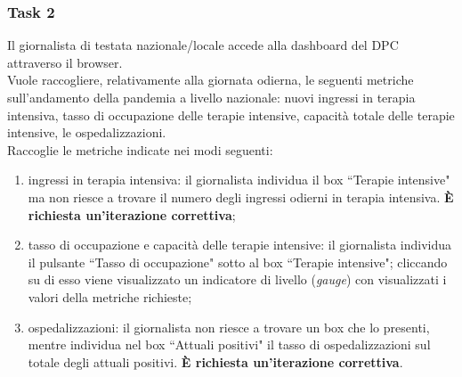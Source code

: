 \subsubsection{Task 2}
\label{sss:cw-task-2}

Il giornalista di testata nazionale/locale accede alla dashboard del DPC attraverso il browser.\\
Vuole raccogliere, relativamente alla giornata odierna, le seguenti metriche sull'andamento della pandemia a livello nazionale: nuovi ingressi in terapia intensiva, tasso di occupazione delle terapie intensive, capacità totale delle terapie intensive, le ospedalizzazioni.\\
Raccoglie le metriche indicate nei modi seguenti:
\begin{enumerate}
    \item ingressi in terapia intensiva: il giornalista individua il box ``Terapie intensive" ma non riesce a trovare il numero degli ingressi odierni in terapia intensiva. \textbf{È richiesta un'iterazione correttiva};\label{cw2:a}
    \item tasso di occupazione e capacità delle terapie intensive: il giornalista individua il pulsante ``Tasso di occupazione" sotto al box ``Terapie intensive"; cliccando su di esso viene visualizzato un indicatore di livello (\textit{gauge}) con visualizzati i valori della metriche richieste; \label{cw2:b}
    \item ospedalizzazioni: il giornalista non riesce a trovare un box che lo presenti, mentre individua nel box ``Attuali positivi" il tasso di ospedalizzazioni sul totale degli attuali positivi. \textbf{È richiesta un'iterazione correttiva}. \label{cw2:c}
\end{enumerate}

